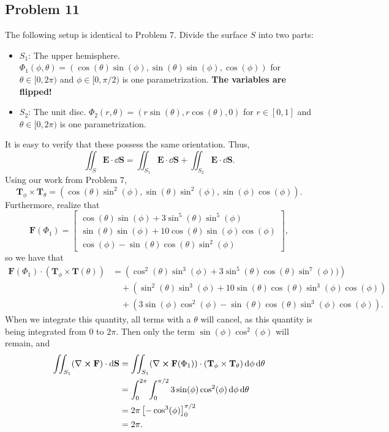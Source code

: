 \documentclass[11pt]{article}
\renewcommand{\vec}[1]{\mathbf{#1}}
\renewcommand{\curl}{\nabla \cross}
\begin{document}
\subsection*{Problem 11}

The following setup is identical to Problem 7. Divide the surface $S$ into two parts:
\begin{itemize}
	\item $S_{1}$: The upper hemisphere. $\Phi_{1}(\phi, \theta) = (\cos(\theta)\sin(\phi), \sin(\theta)\sin(\phi), \cos(\phi))$ for $\theta \in [0, 2\pi)$ and $\phi \in [0, \pi/2)$ is one parametrization. \textbf{The variables are flipped!}
	\item $S_{2}$: The unit disc. $\Phi_{2}(r, \theta) = (r \sin(\theta), r\cos(\theta), 0)$ for $r \in [0, 1]$ and $\theta \in [0, 2\pi)$ is one parametrization.
\end{itemize}
It is easy to verify that these possess the same orientation. Thus,
\begin{equation}
	\iint_{S} \mathbf{E} \cdot \dd{\vec{S}} = \iint_{S_{1}} \mathbf{E} \cdot \dd{\vec{S}} + \iint_{S_{2}} \mathbf{E} \cdot \dd{\vec{S}}.
\end{equation}
Using our work from Problem 7,
\[
	\mathbf{T}_{\phi} \times \mathbf{T}_{\theta} = (\cos(\theta)\sin^{2}(\phi), \sin(\theta)\sin^{2}(\phi), \sin(\phi)\cos(\phi)).
\]
Furthermore, realize that
\[
	\mathbf{F}(\Phi_{1}) = \begin{bmatrix} \cos(\theta)\sin(\phi) + 3\sin^{5}(\theta)\sin^{5}(\phi) \\ \sin(\theta)\sin(\phi) + 10\cos(\theta)\sin(\phi)\cos(\phi) \\ \cos(\phi) - \sin(\theta)\cos(\theta)\sin^{2}(\phi) \end{bmatrix},
\] 
so we have that
\begin{align*}
	\mathbf{F}(\Phi_{1}) \cdot (\mathbf{T}_{\phi} \times \mathbf{T}(\theta)) &= \left( \cos^{2}(\theta)\sin^{3}(\phi) + 3 \sin^{5}(\theta)\cos(\theta)\sin^{7}(\phi)) \right) \\
	& \quad + \left( \sin^{2}(\theta)\sin^{3}(\phi) + 10 \sin(\theta)\cos(\theta)\sin^{3}(\phi)\cos(\phi) \right) \\
	& \quad + \left( 3\sin(\phi)\cos^{2}(\phi) - \sin(\theta)\cos(\theta)\sin^{3}(\phi)\cos(\phi) \right).
\end{align*}
When we integrate this quantity, all terms with a $\theta$ will cancel, as this quantity is being integrated from $0$ to $2\pi$. Then only the term $\sin(\phi)\cos^{2}(\phi)$ will remain, and 
\begin{align*}
	\iint_{S_{1}} (\curl \mathbf{F}) \cdot \dd{\vec{S}} &= \iint_{S_{1}} (\curl \mathbf{F}(\Phi_{1})) \cdot (\mathbf{T}_{\phi} \times \mathbf{T}_{\theta}) \dd{\phi} \dd{\theta} \\
	&= \int_{0}^{2\pi} \int_{0}^{\pi/2} 3\sin(\phi)\cos^{2}(\phi) \dd{\phi} \dd{\theta} \\
	&= 2\pi \left[ -\cos^{3}(\phi) \right]_{0}^{\pi/2} \\
	&= 2\pi.
\end{align*}
\end{document}
